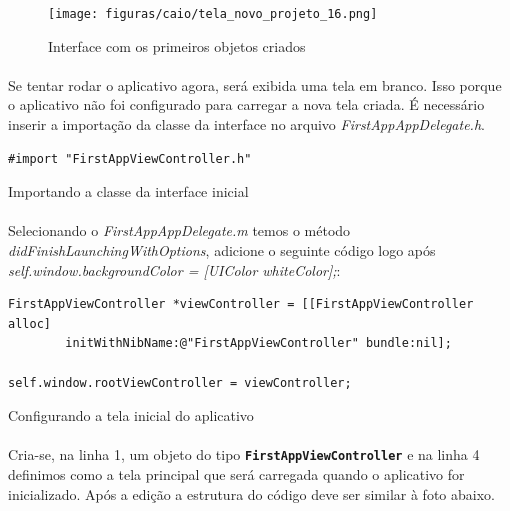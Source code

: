 \documentclass[a4paper,12pt,brazil,doubleside]{book}
\begin{document}
\begin{singlespace}
\begin{figure}[H]
  \centering
  \texttt{[image: figuras/caio/tela\_novo\_projeto\_16.png]}
  \caption{Interface com os primeiros objetos criados}
  \label{fig:a}
\end{figure}

\bigskip

\paragraph{}Se tentar rodar o aplicativo agora, será exibida uma tela em branco. Isso porque o aplicativo não foi configurado para carregar a nova tela criada. É necessário inserir a importação da classe da interface no arquivo \emph{FirstAppAppDelegate.h}.

\begin{listing}[H]
\begin{verbatim}
#import "FirstAppViewController.h"
\end{verbatim}
\caption{Importando a classe da interface inicial}
\end{listing}

\paragraph{}Selecionando o \emph{FirstAppAppDelegate.m} temos o método \emph{didFinishLaunchingWithOptions}, adicione o seguinte código logo após \emph{self.window.backgroundColor = [UIColor whiteColor];}:

\begin{listing}[H]
\begin{verbatim}
FirstAppViewController *viewController = [[FirstAppViewController alloc] 
		initWithNibName:@"FirstAppViewController" bundle:nil];
		
self.window.rootViewController = viewController;    
\end{verbatim}
\caption{Configurando a tela inicial do aplicativo}
\end{listing}

\paragraph{}Cria-se, na linha 1, um objeto do tipo \texttt{\textbf{FirstAppViewController}} e na linha 4 definimos como a tela principal que será carregada quando o aplicativo for inicializado. Após a edição a estrutura do código deve ser similar à foto abaixo.


\end{singlespace}
\end{document}
